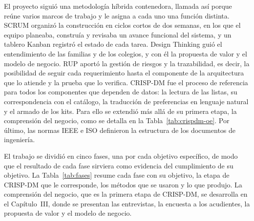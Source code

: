 El proyecto siguió una metodología híbrida contenedora, llamada así porque reúne varios
marcos de trabajo y le asigna a cada uno una función distinta. SCRUM \citep{schwaber_scrum_2020} organizó la
construcción en ciclos cortos de dos semanas, en los que el equipo planeaba, construía y
revisaba un avance funcional del sistema, y un tablero Kanban registró el estado de cada
tarea. Design Thinking \citep{brown_design_2008} guió el entendimiento de las familias y de los colegios, y con
él la propuesta de valor y el modelo de negocio. RUP \citep{kruchten_rup_2003} aportó la gestión de riesgos y la
trazabilidad, es decir, la posibilidad de seguir cada requerimiento hasta el componente de
la arquitectura que lo atiende y la prueba que lo verifica. CRISP-DM \citep{chapman_crisp-dm_2000,wirth_crisp-dm_2000} fue el proceso de
referencia para todos los componentes que dependen de datos: la lectura de las listas, su
correspondencia con el catálogo, la traducción de preferencias en lenguaje natural y el armado de
los kits. Para ello se extendió más allá de su primera etapa, la comprensión del negocio, como
se detalla en la Tabla~\ref{tab:crispdm-oe}. Por último, las normas IEEE e ISO
definieron la estructura de los documentos de ingeniería.

El trabajo se dividió en cinco fases, una por cada objetivo específico, de modo que el
resultado de cada fase sirviera como evidencia del cumplimiento de su objetivo. La
Tabla~\ref{tab:fases} resume cada fase con su objetivo, la etapa de CRISP-DM que le
corresponde, los métodos que se usaron y lo que produjo. La comprensión del negocio, que
es la primera etapa de CRISP-DM, se desarrolla en el Capítulo~III, donde se presentan las
entrevistas, la encuesta a los acudientes, la propuesta de valor y el modelo de negocio.

